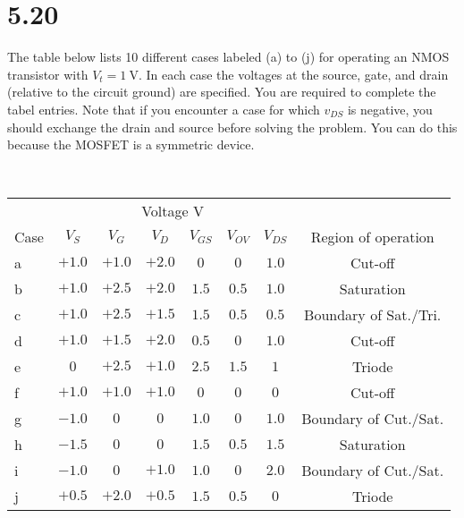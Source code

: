 \documentclass[12pt, a4paper]{article}
\begin{document}
\section{5.20}
The table below lists 10 different cases labeled (a) to (j) for operating an NMOS transistor with $V_t = \SI{1}{\V} $. In each case the voltages at the source, gate, and drain (relative to the circuit ground) are specified. You are required to complete the tabel entries. Note that if you encounter a case for which $v_{DS}$ is negative, you should exchange the drain and source before solving the problem. You can do this because the MOSFET is a symmetric device.


\Ans \\
\begin{center}
  \begin{tabular}{|l|c|c|c|c|c|c|c|}
    \hline
    & \multicolumn{6}{c|}{Voltage \si\V} & \\ \cline{2-7}
    Case & $V_S$ & $V_G$ & $V_D$ & $V_{GS}$ & $V_{OV}$ & $V_{DS}$ & Region of operation \\
    \hline
    a & $+1.0$ & $+1.0$ & $+2.0$ & $0$ & $0$ & $1.0$ & Cut-off \\
    b & $+1.0$ & $+2.5$ & $+2.0$ & $1.5$ & $0.5$ & $1.0$ & Saturation \\
    c & $+1.0$ & $+2.5$ & $+1.5$ & $1.5$ & $0.5$ & $0.5$ & Boundary of Sat./Tri. \\
    d & $+1.0$ & $+1.5$ & $+2.0$ & $0.5$ & $0$ & $1.0$ & Cut-off \\
    e & $0$ & $+2.5$ & $+1.0$ & $2.5$ & $1.5$ & $1$ & Triode \\
    f & $+1.0$ & $+1.0$ & $+1.0$ & $0$ & $0$ & $0$ & Cut-off \\
    g & $-1.0$ & $0$ & $0$ & $1.0$ & $0$ & $1.0$ & Boundary of Cut./Sat. \\
    h & $-1.5$ & $0$ & $0$ & $1.5$ & $0.5$ & $1.5$ & Saturation \\
    i & $-1.0$ & $0$ & $+1.0$ & $1.0$ & $0$ & $2.0$ & Boundary of Cut./Sat. \\
    j & $+0.5$ & $+2.0$ & $+0.5$ & $1.5$ & $0.5$ & $0$ & Triode \\
    \hline
  \end{tabular}
\end{center}

\clearpage
\end{document}
